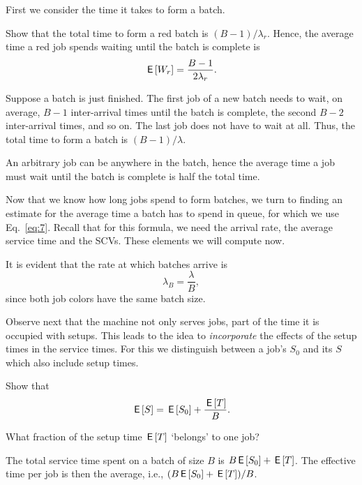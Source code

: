 First we consider the time it takes to form a batch. 
\begin{exercise}
  Show that the total time to form a red batch is $(B-1)/\lambda_r$. Hence, the average time a red job spends waiting until the batch is complete is
\begin{equation*}
  \,\mathsf{E}\left[W_r\right] = \frac{B-1}{2\lambda_r}.
\end{equation*}
\begin{solution}
  Suppose a batch is just finished. The first job of a new batch needs to wait, on average, $B-1$  inter-arrival times until the batch is complete, the second $B-2$ inter-arrival times, and so on. The last job does not have to wait at all. Thus, the total time to form a batch is $(B-1)/\lambda$. 

An arbitrary job can be anywhere in the batch, hence the average time a job must wait until the batch is complete is half the total time. 
\end{solution}
\end{exercise}

Now that we know how long jobs spend to form batches, we turn to finding an estimate for the average time a batch has to spend in queue, for which we use Eq.~\eqref{eq:7}. Recall that for  this formula, we need the arrival rate, the average service time and the SCVs. These elements we will compute now. 

It is evident that the  rate at which batches arrive is 
\begin{equation*}
  \lambda_B = \frac \lambda B,
\end{equation*}
since both job colors have the same batch size.  

Observe next that the machine not only  serves jobs, part of the time it is  occupied with setups. This leads to the idea to  \emph{incorporate} the effects of the setup times in the service times. For this we distinguish between a job's  $S_0$  and its  $S$ which also include setup times. 

\begin{exercise}
  Show that
  \begin{equation*}
    \,\mathsf{E}\left[S\right] = \,\mathsf{E}\left[S_0\right] + \frac{\,\mathsf{E}\left[T\right]} B.
  \end{equation*}
  \begin{hint}
    What fraction of the setup time $\,\mathsf{E}\left[T\right]$ `belongs' to one job?
  \end{hint}
  \begin{solution}
    The total service time spent on a batch of size $B$ is $B \,\mathsf{E}\left[S_0\right] + \,\mathsf{E}\left[T\right]$. The effective time per job is then the average, i.e.,  $(B \,\mathsf{E}\left[S_0\right]+\,\mathsf{E}\left[T\right])/B$. 
  \end{solution}
\end{exercise}

